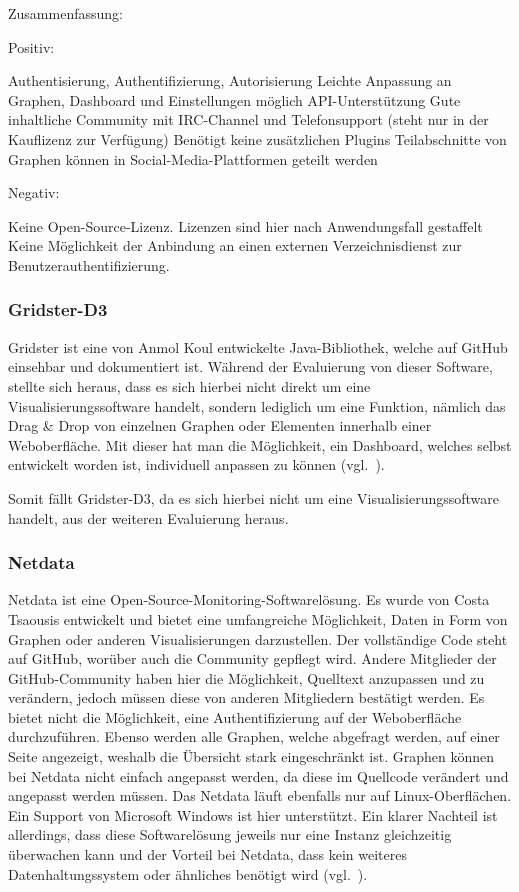 Zusammenfassung:

Positiv:

\begin{outline}
  \1 Authentisierung, Authentifizierung, Autorisierung
  \1 Leichte Anpassung an Graphen, Dashboard und Einstellungen möglich
  \1 API-Unterstützung
  \1 Gute inhaltliche Community mit IRC-Channel und Telefonsupport (steht
  nur in der Kauflizenz zur Verfügung)
  \1 Benötigt keine zusätzlichen Plugins
  \1 Teilabschnitte von Graphen können in Social-Media-Plattformen geteilt
  werden
\end{outline}

Negativ:

\begin{outline}
  \1 Keine Open-Source-Lizenz. Lizenzen sind hier nach Anwendungsfall
  gestaffelt
  \1 Keine Möglichkeit der Anbindung an einen externen Verzeichnisdienst zur
  Benutzerauthentifizierung.
\end{outline}
\mr%

\subsubsection{Gridster-D3}
\label{subsubsec:gridster-d3}
Gridster ist eine von Anmol Koul entwickelte Java-Bibliothek, welche auf
\gls{GitHub} einsehbar und dokumentiert ist. Während der Evaluierung von dieser
Software, stellte sich heraus, dass es sich hierbei nicht direkt um eine
Visualisierungssoftware handelt, sondern lediglich um eine Funktion, nämlich
das Drag \& Drop von einzelnen Graphen oder Elementen innerhalb einer
Weboberfläche. Mit dieser hat man die Möglichkeit, ein Dashboard, welches
selbst entwickelt worden ist, individuell anpassen zu
können (vgl.~\cite{gridster-d3}).

Somit fällt Gridster-D3, da es sich hierbei nicht um eine
Visualisierungssoftware handelt, aus der weiteren Evaluierung heraus.

\subsubsection{Netdata}
\label{subsubsec:netdata}
Netdata ist eine Open-Source-Monitoring-Softwarelösung. Es wurde von Costa
Tsaousis entwickelt und bietet eine umfangreiche Möglichkeit, Daten in Form von
Graphen oder anderen Visualisierungen darzustellen. Der vollständige Code steht
auf GitHub, worüber auch die Community gepflegt wird. Andere Mitglieder der
GitHub-Community haben hier die Möglichkeit, Quelltext anzupassen und zu
verändern, jedoch müssen diese von anderen Mitgliedern bestätigt werden. Es
bietet nicht die Möglichkeit, eine Authentifizierung auf der Weboberfläche
durchzuführen. Ebenso werden alle Graphen, welche abgefragt werden, auf einer
Seite angezeigt, weshalb die Übersicht stark eingeschränkt ist. Graphen können
bei Netdata nicht einfach angepasst werden, da diese im Quellcode verändert und
angepasst werden müssen. Das Netdata läuft ebenfalls nur auf Linux-Oberflächen.
Ein Support von Microsoft Windows ist hier unterstützt. Ein klarer Nachteil ist
allerdings, dass diese Softwarelösung jeweils nur eine Instanz gleichzeitig
überwachen kann und der Vorteil bei Netdata, dass kein weiteres
Datenhaltungssystem oder ähnliches benötigt wird (vgl.~\cite{netdata}).

